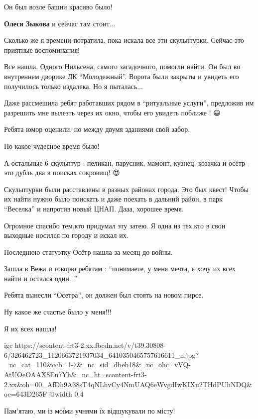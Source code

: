  
 
 
 
 

\qqSecCmt


Он был возле башни красиво было!

\begin{itemize} %
\textbf{Олеся Зыкова} и сейчас там стоит...
\end{itemize} %


Сколько же я времени потратила, пока искала все эти скульптурки. Сейчас это
приятные воспоминания! 🤗

Все нашла. Одного Нильсена, самого загадочного, помогли найти. Он был во
внутреннем дворике ДК \enquote{Молодежный}. Ворота были закрыты и увидеть его
получилось только издалека. Но я пыталась...

Даже рассмешила ребят работавших рядом в \enquote{ритуальные услуги}, предложив им
разрешить мне вылезть через их окно, чтобы его увидеть поближе ! 😀

Ребята юмор оценили, но между двумя зданиями свой забор.

Но какое чудесное время было!


А остальные 6 скульптур : пеликан, парусник, мамонт, кузнец, козачка и осётр -
это дубль два в поисках сокровищ! 😍🤩

Скульптурки были расставлены в разных районах города. Это был квест! Чтобы их
найти нужно было поискать и даже поехать в дальний район, в парк \enquote{Веселка} и
напротив новый ЦНАП. Дааа, хорошее время.

Огромное спасибо тем,кто придумал эту затею. Я одна из тех,кто в свои выходные носился по городу и искал их.

Последнюю статуэтку Осётр нашла за месяц до войны. 🫣

Зашла в Вежа и говорю ребятам : \enquote{понимаете, у меня мечта, я хочу их всех найти и остался один...}

Ребята вынесли \enquote{Осетра}, он должен был стоять на новом пирсе.

Ну какое же счастье было у меня!!!

Я их всех нашла! 🥰

\ifcmt
  igc https://scontent-frt3-2.xx.fbcdn.net/v/t39.30808-6/326462723_1120663721937034_6410350465757616611_n.jpg?_nc_cat=110&ccb=1-7&_nc_sid=dbeb18&_nc_ohc=vVQ-AtUOeOAAX8En7Yh&_nc_ht=scontent-frt3-2.xx&oh=00_AfDh9A38sT4qNLhvCy4NmUAQ6eWvgdIwKIXu2THdPUhNDQ&oe=643D265F
	@width 0.4
\fi


Пам'ятаю, ми із моїми учнями їх відшукували по місту!
